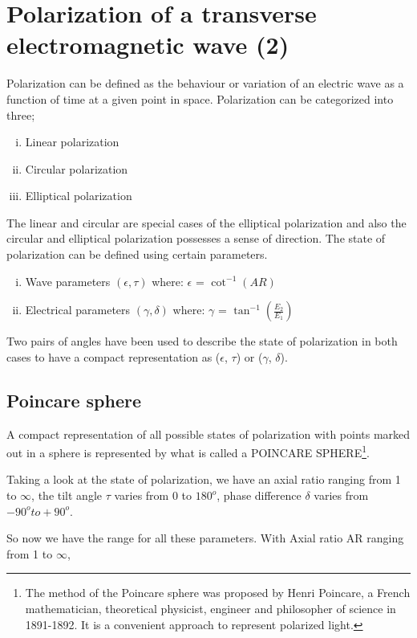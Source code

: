 \chapter{Polarization of a transverse electromagnetic wave (2)}\label{lec:lec24}
Polarization can be defined as the behaviour or variation of an electric wave as a function of time at a given point in space. Polarization can be categorized into three; 
\begin{enumerate}[(i)]
\item Linear polarization
\item Circular polarization
\item Elliptical polarization
\end{enumerate}
The linear and circular are special cases of the elliptical polarization and also the circular and elliptical polarization possesses a sense of direction. The state of polarization can be defined using certain parameters.
\begin{enumerate}[(i)]
\item Wave parameters $(\epsilon,\tau)$
\newline where: $\epsilon$ = $\cot^{-1}(AR)$
\item Electrical parameters $(\gamma, \delta)$
\newline	where: $\gamma$ = $\tan^{-1} (\frac{E_{2}}{E_{1}})$
\end{enumerate}
Two pairs of angles have been used to describe the state of polarization in both cases to have a compact representation as ($\epsilon$, $\tau$)  or ($\gamma$, $\delta$).

\section{Poincare sphere}
A compact representation of all possible states of polarization with points marked out in a sphere is represented by what is called a POINCARE SPHERE\footnote{
The method of the Poincare sphere was proposed by Henri Poincare, a French mathematician, theoretical physicist, engineer and philosopher of science in 1891-1892. It is a convenient approach to represent polarized light.
}.

Taking a look at the state of polarization, we have an axial ratio ranging from 1 to $\infty$, the tilt angle $\tau$ varies from 0 to $180^{o}$, phase difference $\delta$ varies from $-90^{o} to +90^{o}$.

So now we have the range for all these parameters. With Axial ratio AR ranging from 1 to $\infty$, 

